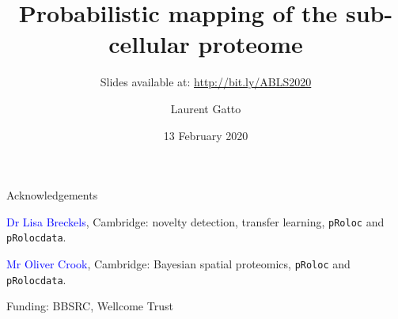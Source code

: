 \documentclass{beamer}
\title{Probabilistic mapping  of the sub-cellular proteome}
\author[]{Laurent Gatto}
\date{13 February 2020}
\institute[]{CBIO, de Duve Institute, UCLouvain}
\subtitle{Slides available at: \url{http://bit.ly/ABLS2020}}
\theoremstyle{example}
\begin{document}





\begin{frame}[plain]
\titlepage
\end{frame}


\begin{frame}{Acknowledgements}


\textcolor{Blue}{Dr Lisa Breckels}, Cambridge: novelty detection,
transfer learning, \texttt{pRoloc} and \texttt{pRolocdata}.

\bigskip

\textcolor{Blue}{Mr Oliver Crook}, Cambridge: Bayesian spatial
proteomics, \texttt{pRoloc} and \texttt{pRolocdata}.

\bigskip

Funding: BBSRC, Wellcome Trust

\end{frame}
\end{document}
